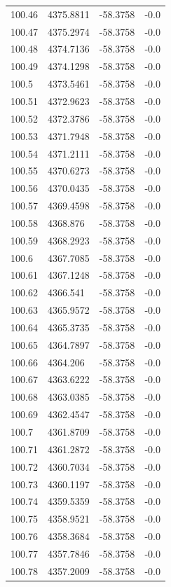 \begin{table}[H]
\begin{tabular}{llll}
100.46 & 4375.8811 & -58.3758 & -0.0 \\
100.47 & 4375.2974 & -58.3758 & -0.0 \\
100.48 & 4374.7136 & -58.3758 & -0.0 \\
100.49 & 4374.1298 & -58.3758 & -0.0 \\
100.5 & 4373.5461 & -58.3758 & -0.0 \\
100.51 & 4372.9623 & -58.3758 & -0.0 \\
100.52 & 4372.3786 & -58.3758 & -0.0 \\
100.53 & 4371.7948 & -58.3758 & -0.0 \\
100.54 & 4371.2111 & -58.3758 & -0.0 \\
100.55 & 4370.6273 & -58.3758 & -0.0 \\
100.56 & 4370.0435 & -58.3758 & -0.0 \\
100.57 & 4369.4598 & -58.3758 & -0.0 \\
100.58 & 4368.876 & -58.3758 & -0.0 \\
100.59 & 4368.2923 & -58.3758 & -0.0 \\
100.6 & 4367.7085 & -58.3758 & -0.0 \\
100.61 & 4367.1248 & -58.3758 & -0.0 \\
100.62 & 4366.541 & -58.3758 & -0.0 \\
100.63 & 4365.9572 & -58.3758 & -0.0 \\
100.64 & 4365.3735 & -58.3758 & -0.0 \\
100.65 & 4364.7897 & -58.3758 & -0.0 \\
100.66 & 4364.206 & -58.3758 & -0.0 \\
100.67 & 4363.6222 & -58.3758 & -0.0 \\
100.68 & 4363.0385 & -58.3758 & -0.0 \\
100.69 & 4362.4547 & -58.3758 & -0.0 \\
100.7 & 4361.8709 & -58.3758 & -0.0 \\
100.71 & 4361.2872 & -58.3758 & -0.0 \\
100.72 & 4360.7034 & -58.3758 & -0.0 \\
100.73 & 4360.1197 & -58.3758 & -0.0 \\
100.74 & 4359.5359 & -58.3758 & -0.0 \\
100.75 & 4358.9521 & -58.3758 & -0.0 \\
100.76 & 4358.3684 & -58.3758 & -0.0 \\
100.77 & 4357.7846 & -58.3758 & -0.0 \\
100.78 & 4357.2009 & -58.3758 & -0.0 \\

\end{tabular}
\end{table}
